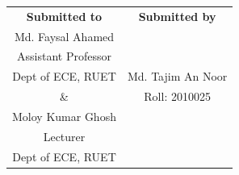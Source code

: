 \begin{center}
    \vspace{15mm}
    \begin{tabular}{c|c}
        \textbf{Submitted to} & \textbf{Submitted by} \\
        Md. Faysal Ahamed     &                       \\
        Assistant Professor   &                       \\
        Dept of ECE, RUET     & Md. Tajim An Noor     \\
        \&                    & Roll: 2010025         \\
        Moloy Kumar Ghosh     &                       \\
        Lecturer              &                       \\
        Dept of ECE, RUET     &                       \\
    \end{tabular}

\end{center}
\vspace*{\fill}
